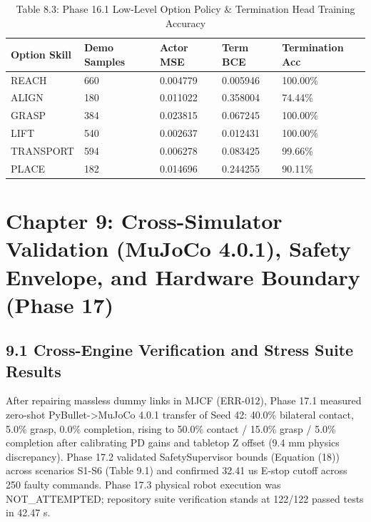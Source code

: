 \documentclass[11pt,a4paper,oneside]{book}
\begin{document}
\begin{longtable}{l l l l l}\caption{Table 8.3: Phase 16.1 Low-Level Option Policy \& Termination Head Training Accuracy}\\\toprule
Option Skill & Demo Samples & Actor MSE & Term BCE & Termination Acc \\ \midrule \endhead
REACH & 660 & 0.004779 & 0.005946 & 100.00\% \\
ALIGN & 180 & 0.011022 & 0.358004 & 74.44\% \\
GRASP & 384 & 0.023815 & 0.067245 & 100.00\% \\
LIFT & 540 & 0.002637 & 0.012431 & 100.00\% \\
TRANSPORT & 594 & 0.006278 & 0.083425 & 99.66\% \\
PLACE & 182 & 0.014696 & 0.244255 & 90.11\% \\
\bottomrule \end{longtable}
\chapter{Chapter 9: Cross-Simulator Validation (MuJoCo 4.0.1), Safety Envelope, and Hardware Boundary (Phase 17)}
\section{9.1 Cross-Engine Verification and Stress Suite Results}
After repairing massless dummy links in MJCF (ERR-012), Phase 17.1 measured zero-shot PyBullet->MuJoCo 4.0.1 transfer of Seed 42: 40.0\% bilateral contact, 5.0\% grasp, 0.0\% completion, rising to 50.0\% contact / 15.0\% grasp / 5.0\% completion after calibrating PD gains and tabletop Z offset (9.4 mm physics discrepancy). Phase 17.2 validated SafetySupervisor bounds (Equation (18)) across scenarios S1-S6 (Table 9.1) and confirmed 32.41 us E-stop cutoff across 250 faulty commands. Phase 17.3 physical robot execution was NOT\_ATTEMPTED; repository suite verification stands at 122/122 passed tests in 42.47 s.
\end{document}
